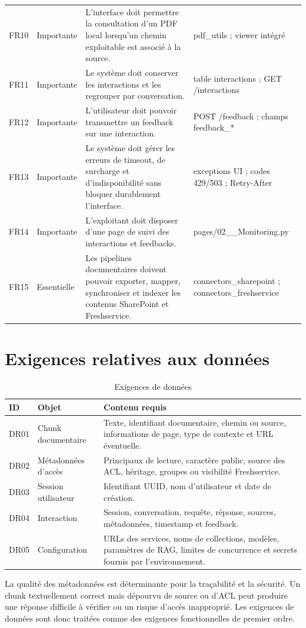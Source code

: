 \begin{table}[H]
\begin{tabular}{p{1.2cm}p{2cm}p{7.1cm}p{3.4cm}}
FR10 & Importante & L'interface doit permettre la consultation d'un PDF local lorsqu'un chemin exploitable est associé à la source. & pdf\_utils ; viewer intégré \\
FR11 & Importante & Le système doit conserver les interactions et les regrouper par conversation. & table interactions ; GET /interactions \\
FR12 & Importante & L'utilisateur doit pouvoir transmettre un feedback sur une interaction. & POST /feedback ; champs feedback\_* \\
FR13 & Importante & Le système doit gérer les erreurs de timeout, de surcharge et d'indisponibilité sans bloquer durablement l'interface. & exceptions UI ; codes 429/503 ; Retry-After \\
FR14 & Importante & L'exploitant doit disposer d'une page de suivi des interactions et feedbacks. & pages/02\_\_Monitoring.py \\
FR15 & Essentielle & Les pipelines documentaires doivent pouvoir exporter, mapper, synchroniser et indexer les contenus SharePoint et Freshservice. & connectors\_sharepoint ; connectors\_freshservice \\
\bottomrule
\end{tabular}
\end{table}

\section{Exigences relatives aux données}

\begin{table}[H]
\centering
\caption{Exigences de données}
\label{tab:datareq_ch4}
\begin{tabular}{p{1.2cm}p{3cm}p{9.5cm}}
\toprule
\textbf{ID} & \textbf{Objet} & \textbf{Contenu requis} \\
\midrule
DR01 & Chunk documentaire & Texte, identifiant documentaire, chemin ou source, informations de page, type de contexte et URL éventuelle. \\
DR02 & Métadonnées d'accès & Principaux de lecture, caractère public, source des ACL, héritage, groupes ou visibilité Freshservice. \\
DR03 & Session utilisateur & Identifiant UUID, nom d'utilisateur et date de création. \\
DR04 & Interaction & Session, conversation, requête, réponse, sources, métadonnées, timestamp et feedback. \\
DR05 & Configuration & URLs des services, noms de collections, modèles, paramètres de RAG, limites de concurrence et secrets fournis par l'environnement. \\
\bottomrule
\end{tabular}
\end{table}

La qualité des métadonnées est déterminante pour la traçabilité et la sécurité. Un chunk textuellement correct mais dépourvu de source ou d'ACL peut produire une réponse difficile à vérifier ou un risque d'accès inapproprié. Les exigences de données sont donc traitées comme des exigences fonctionnelles de premier ordre.
